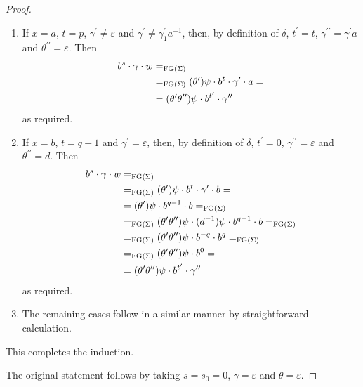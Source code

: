 \begin{proof}
\begin{enumerate}[1)]
    as required.
  \item If $x = a$, $t = p$, $\gamma^\prime \neq \varepsilon$ and
    $\gamma^\prime \neq \gamma_1^{\prime} a^{-1}$, then, by definition of $\delta$,
    $t^\prime = t$, $\gamma^{\prime\prime} = \gamma^\prime a$ and $\theta^{\prime\prime} = \varepsilon$. Then
    \begin{align*}
      b^s \cdot \gamma \cdot w &=_{\textrm{FG}(\Sigma)}\\
      &=_{\textrm{FG}(\Sigma)}
      (\theta^\prime)\psi \cdot b^{t} \cdot \gamma^\prime \cdot a =\\
      &=
      (\theta^\prime\theta^{\prime\prime})\psi \cdot b^{t^\prime} \cdot \gamma^{\prime\prime}
    \end{align*}
    as required.
  \item If $x = b$, $t = q-1$ and $\gamma^\prime = \varepsilon$, then, by definition of $\delta$,
    $t^\prime = 0$, $\gamma^{\prime\prime} = \varepsilon$ and $\theta^{\prime\prime} = d$. Then
    \begin{align*}
      b^s \cdot \gamma \cdot w &=_{\textrm{FG}(\Sigma)}\\
      &=_{\textrm{FG}(\Sigma)}
      (\theta^\prime)\psi \cdot b^{t} \cdot \gamma^\prime \cdot b =\\
      &=
      (\theta^{\prime})\psi \cdot b^{q-1} \cdot b =_{\textrm{FG}(\Sigma)}\\
      &=_{\textrm{FG}(\Sigma)}
      (\theta^\prime\theta^{\prime\prime})\psi \cdot (d^{-1})\psi \cdot b^{q-1} \cdot b  =_{\textrm{FG}(\Sigma)}\\
      &=_{\textrm{FG}(\Sigma)}
      (\theta^\prime\theta^{\prime\prime})\psi \cdot b^{-q} \cdot b^{q} =_{\textrm{FG}(\Sigma)}\\
      &=_{\textrm{FG}(\Sigma)}
      (\theta^\prime\theta^{\prime\prime})\psi \cdot b^0  =\\
      &=
      (\theta^\prime\theta^{\prime\prime})\psi \cdot b^{t^\prime} \cdot \gamma^{\prime\prime}
    \end{align*}
    as required.
  \item The remaining cases follow in a similar manner by straightforward calculation.
  \end{enumerate}
  This completes the induction.

  The original statement follows by taking $s = s_0 = 0$, $\gamma = \varepsilon$ and $\theta = \varepsilon$.
\end{proof}


